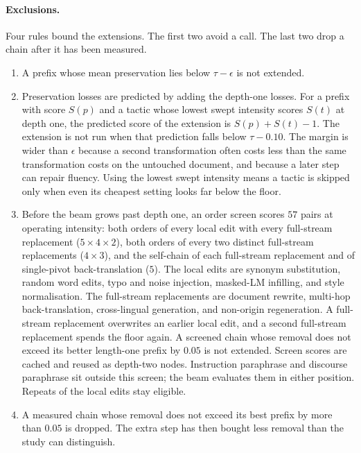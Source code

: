 \paragraph{Exclusions.}
Four rules bound the extensions. The first two avoid a call. The last two drop a chain after it has been measured.
\begin{enumerate}
  \item A prefix whose mean preservation lies below $\tau - \epsilon$ is not extended.
  \item Preservation losses are predicted by adding the depth-one losses. For a prefix with score $S(p)$ and a tactic whose lowest swept intensity scores $S(t)$ at depth one, the predicted score of the extension is $S(p) + S(t) - 1$. The extension is not run when that prediction falls below $\tau - 0.10$. The margin is wider than $\epsilon$ because a second transformation often costs less than the same transformation costs on the untouched document, and because a later step can repair fluency. Using the lowest swept intensity means a tactic is skipped only when even its cheapest setting looks far below the floor.
  \item Before the beam grows past depth one, an order screen scores $57$ pairs at operating intensity: both orders of every local edit with every full-stream replacement ($5 \times 4 \times 2$), both orders of every two distinct full-stream replacements ($4 \times 3$), and the self-chain of each full-stream replacement and of single-pivot back-translation ($5$). The local edits are synonym substitution, random word edits, typo and noise injection, masked-LM infilling, and style normalisation. The full-stream replacements are document rewrite, multi-hop back-translation, cross-lingual generation, and non-origin regeneration. A full-stream replacement overwrites an earlier local edit, and a second full-stream replacement spends the floor again. A screened chain whose removal does not exceed its better length-one prefix by $0.05$ is not extended. Screen scores are cached and reused as depth-two nodes. Instruction paraphrase and discourse paraphrase sit outside this screen; the beam evaluates them in either position. Repeats of the local edits stay eligible.
  \item A measured chain whose removal does not exceed its best prefix by more than $0.05$ is dropped. The extra step has then bought less removal than the study can distinguish.
\end{enumerate}

